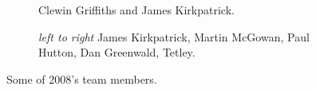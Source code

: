 \begin{figure}
    \begin{subfigure}[t]{0.49\textwidth}
        \centering
        \caption{Clewin Griffiths and James Kirkpatrick. } \label{clewin jkp mig}
    \end{subfigure}
    \hfill
    \begin{subfigure}[t]{0.49\textwidth}
        \centering
        \caption{\textit{left to right} James Kirkpatrick, Martin McGowan, Paul Hutton, Dan Greenwald, Tetley. } \label{sunset lounge}
    \end{subfigure}

    \caption{Some of 2008's team members.}
\end{figure}
